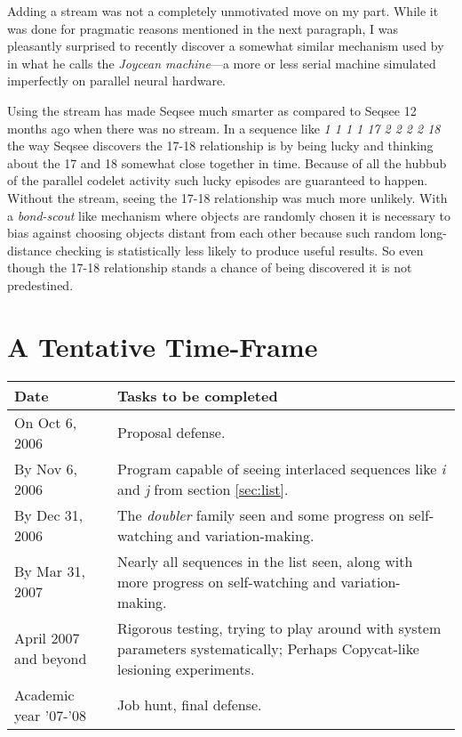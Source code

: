 \documentclass[letterpaper]{article}
\begin{document}
 Adding a stream was not a completely unmotivated move on my part. While it was done for pragmatic reasons mentioned in the next paragraph, I was pleasantly surprised to recently discover a somewhat similar mechanism used by  in what he calls the \emph{Joycean machine}---a more or less serial machine simulated imperfectly on parallel neural hardware.

Using the stream has made Seqsee much smarter as compared to Seqsee 12 months ago when there was no stream.  In a sequence like \emph{1 1 1 1 17 2 2 2 2 18} the way Seqsee discovers the 17-18 relationship is by being lucky and thinking about the 17 and 18 somewhat close together in time.  Because of all the hubbub of the parallel codelet activity such lucky episodes are guaranteed to happen.  Without the stream, seeing the 17-18 relationship was much more unlikely.  With a \emph{bond-scout} like mechanism where objects are randomly chosen it is necessary to bias against choosing objects distant from each other because such random long-distance checking is statistically less likely to produce useful results.  So even though the 17-18 relationship stands a chance of being discovered it is not predestined.


\section{A Tentative Time-Frame}
\begin{tabular}{l|p{4in}}
 \textbf{Date} & \textbf{Tasks to be completed}\\ \hline
On Oct 6, 2006 & Proposal defense. \\
By Nov 6, 2006 & Program capable of seeing interlaced sequences like \emph{i} and \emph{j} from section \ref{sec:list}.\\
By Dec 31, 2006 & The \emph{doubler} family seen and some progress on self-watching and variation-making.\\
By Mar 31, 2007 & Nearly all sequences in the list seen, along with more  progress on self-watching and variation-making.\\
April 2007 and beyond & Rigorous testing, trying to play around with system parameters systematically; Perhaps Copycat-like lesioning experiments.\\
Academic year '07-'08 & Job hunt, final defense.\\
\hline 
\end{tabular}


\printindex
\end{document}
